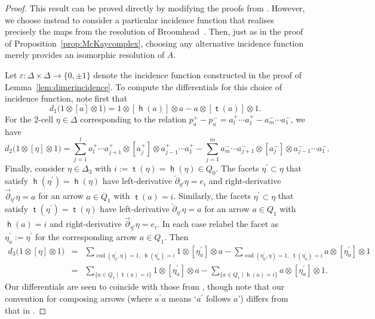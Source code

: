 \documentclass[11pt,a4paper]{amsart}
\numberwithin{equation}{section}
\theoremstyle{definition}
\theoremstyle{remark}
\newcommand{\codim}{\operatorname{cod}}
\newcommand{\head}{\operatorname{\mathsf{h}}}
\newcommand{\tail}{\operatorname{\mathsf{t}}}
\begin{document}
\begin{proof}
This result can be proved directly by modifying the proofs from \cite{Broomhead, Davison,MozgovoyReineke}. However, we choose instead to consider a particular incidence function that realises precisely the maps from the resolution of Broomhead~\cite{Broomhead}. Then, just as in the proof of Proposition~\ref{prop:McKaycomplex}, choosing any alternative incidence function merely provides an isomorphic resolution of $A$.

Let $\varepsilon\colon \Delta\times \Delta \to \{0,\pm 1\}$  denote the incidence function constructed in the proof of Lemma~\ref{lem:dimerincidence}.  To compute the differentials for this choice of incidence function, note first that
\[
d_1\big(1\otimes[a]\otimes 1\big) =  1\otimes[\head(a)]\otimes a - a\otimes [\tail(a)]\otimes 1.
\]
For the 2-cell $\eta\in \Delta$ corresponding to the relation $p_a^+-p_a^- = a_l^+\cdots a_1^+ - a_m^-\cdots a_1^-$, we have
\[
d_2\big(1\otimes[\eta]\otimes 1\big) = \sum_{j=1}^l   a_l^+\cdots a_{j+1}^+\otimes [a_j^+]\otimes a_{j-1}^+\cdots a_1^+  -  \sum_{j=1}^m  a_m^-\cdots a_{j+1}^-\otimes [a_j^-]\otimes a_{j-1}^-\cdots a_1^- .
\]
Finally, consider $\eta\in \Delta_3$ with $i:= \tail(\eta)=\head(\eta)\in Q_0$. The facets $\eta^\prime\subset \eta$ that satisfy $\head(\eta^\prime)=\head(\eta)$ have left-derivative $\overleftarrow{\partial}_{\!\eta'}\eta = e_i$ and right-derivative $\overrightarrow{\partial}_{\!\eta'}\eta =a$ for an arrow $a\in Q_1$ with $\tail(a)=i$. Similarly, the  facets $\eta^\prime\subset \eta$ that satisfy $\tail(\eta^\prime)=\tail(\eta)$ have left-derivative $\overleftarrow{\partial}_{\!\eta'}\eta = a$ for an arrow $a\in Q_1$ with $\head(a)=i$ and right-derivative $\overrightarrow{\partial}_{\!\eta'}\eta =e_i$. In each case relabel the facet as $\eta^\prime_a:=\eta^\prime$ for the corresponding arrow $a\in Q_1$. Then
\begin{eqnarray*}
d_3\big(1\otimes[\eta]\otimes 1\big) & = & \sum_{\codim(\eta_a^\prime,\eta)=1,\; \head(\eta_a^\prime)=i} 1\otimes [\eta^\prime_a]\otimes a - \sum_{\codim(\eta_a^\prime,\eta)=1,\; \tail(\eta_a^\prime)=i} a\otimes [\eta^\prime_a]\otimes 1\\
 & = &  \sum_{\{a\in Q_1 \mid \tail(a)=i\}} 1\otimes [\eta^\prime_a]\otimes a - \sum_{\{a\in Q_1 \mid \head(a)=i\}} a\otimes [\eta^\prime_a]\otimes 1.
\end{eqnarray*}
Our differentials are seen to coincide with those from \cite[Theorem 7.3]{Broomhead}, though note that our convention for composing arrows (where $a^\prime a$ means `$a^\prime$ follows $a$') differs from that in \cite{Broomhead}. 
\end{proof}
\end{document}
